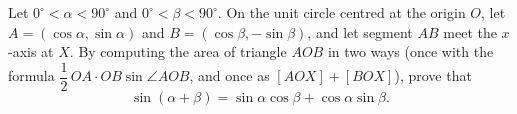 Let $0^\circ<\alpha<90^\circ$ and $0^\circ<\beta<90^\circ$. On the unit circle centred at the origin $O$, let $A=(\cos\alpha,\sin\alpha)$ and $B=(\cos\beta,-\sin\beta)$, and let segment $AB$ meet the $x$-axis at $X$. By computing the area of triangle $AOB$ in two ways (once with the formula $\dfrac{1}{2}\,OA\cdot OB\sin\angle AOB$, and once as $[AOX]+[BOX]$), prove that
\[\sin(\alpha+\beta)=\sin\alpha\cos\beta+\cos\alpha\sin\beta.\]
